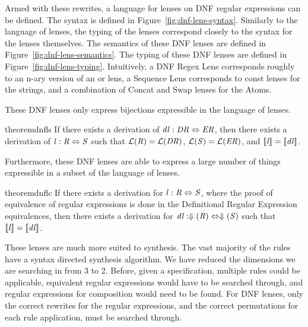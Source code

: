 \documentclass[numbers]{sigplanconf}
\begin{document}
Armed with these rewrites, a language for lenses on DNF regular
expressions can be defined.
The syntax is defined in Figure~\ref{fig:dnf-lens-syntax}.
Similarly to the language of lenses, the typing of the lenses
correspond closely to the syntax for the lenses themselves.
The semantics of these DNF lenses are defined in
Figure~\ref{fig:dnf-lens-semantics}.
The typing of these DNF lenses are defined in Figure~\ref{fig:dnf-lens-typing}.
Intuitively, a DNF Regex Lens corresponds roughly to an n-ary version of an or lens,
a Sequence Lens corresponds to const lenses for the strings, and a combination of
Concat and Swap lenses for the Atoms.

These DNF lenses only express bijections expressible in the language of lenses.
\begin{restatable}{theorem}{dnfls}
\label{thm:dnfls}
If there exists a derivation of $\mathit{dl} : \mathit{DR} \Leftrightarrow \mathit{ER}$,
then there exists a derivation of $\mathit{l} : \mathit{R} \Leftrightarrow \mathit{S}$ such that
$\mathcal{L}(\mathit{R})=\mathcal{L}(\mathit{DR})$,
$\mathcal{L}(\mathit{S})=\mathcal{L}(\mathit{ER})$, and
$[ \! [\mathit{l}] \! ]=[ \! [\mathit{dl}] \! ]$.
\end{restatable}

Furthermore, these DNF lenses are able to express a large number of things
expressible in a subset of the language of lenses.
\begin{restatable}{theorem}{dnflc}
\label{thm:dnflc}
If there exists a derivation for $\mathit{l} : \mathit{R} \Leftrightarrow
\mathit{S}$,
where the proof of equivalence of regular expressions is done in the
Definitional Regular Expression equivalences,
then there exists a derivation for
$\mathit{dl} : \Downarrow(\mathit{R}) \Leftrightarrow \Downarrow(\mathit{S})$
such that $[ \! [\mathit{l}] \! ]=[ \! [\mathit{dl}] \! ]$.
\end{restatable}


These lenses are much more suited to synthesis.
The vast majority of the rules have a syntax directed synthesis algorithm.
We have reduced the dimensions we are searching in from 3 to 2.  Before, given a
specification, multiple rules could be applicable, equivalent regular
expressions would have to be searched through, and regular expressions for
composition would need to be found.
For DNF lenses, only the correct rewrites for the regular expressions, and the
correct permutations for each rule application, must be searched through.
\end{document}
